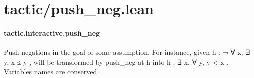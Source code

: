 \documentclass{article}
\begin{document}
\section{tactic/push\_neg.lean}\paragraph{tactic.interactive.push\_neg}
\par
Push negations in the goal of some assumption.
For instance, given 
\colorbox[RGB]{253,246,227}{{{{\color[RGB]{101, 123, 131} h :  }}}{{{\color[RGB]{181, 137, 0} ¬ }}}{{{\color[RGB]{101, 123, 131}   }}}{{{\color[RGB]{133, 153, 0} ∀ }}}{{{\color[RGB]{101, 123, 131}  x, ∃ y, x  }}}{{{\color[RGB]{181, 137, 0} ≤ }}}{{{\color[RGB]{101, 123, 131}  y }}}}, will be transformed by 
\colorbox[RGB]{253,246,227}{{{{\color[RGB]{101, 123, 131} push\_neg  }}}{{{\color[RGB]{133, 153, 0} at }}}{{{\color[RGB]{101, 123, 131}  h }}}} into
\colorbox[RGB]{253,246,227}{{{{\color[RGB]{101, 123, 131} h : ∃ x,  }}}{{{\color[RGB]{133, 153, 0} ∀ }}}{{{\color[RGB]{101, 123, 131}  y, y  }}}{{{\color[RGB]{181, 137, 0} < }}}{{{\color[RGB]{101, 123, 131}  x }}}}. Variables names are conserved.
\end{document}
